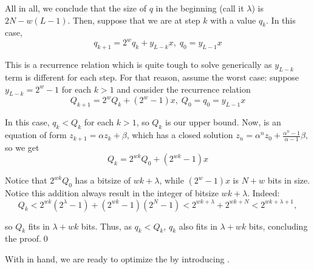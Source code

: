 \documentclass{iacrtrans}
\begin{document}
All in all, we conclude that the size of $q$ in the beginning (call it $\lambda$) is $2N - w(L-1)$. Then, suppose that we are at step $k$ with a value $q_k$. In this case,
\begin{equation}
    q_{k+1} = 2^wq_k + y_{L-k}x, \; q_0 = y_{L-1}x
\end{equation}

This is a recurrence relation which is quite tough to solve generically as $y_{L-k}$ term is different for each step. For that reason, assume the worst case: suppose $y_{L-k} = 2^w-1$ for each $k > 1$ and consider the recurrence relation
\begin{equation}\label{eq:recurrence_Q}
    Q_{k+1} = 2^wQ_k + (2^w-1)x, \; Q_0 = q_0 = y_{L-1}x
\end{equation}

In this case, $q_k < Q_k$ for each $k > 1$, so $Q_k$ is our upper bound. Now,  is an equation of form $z_{k+1}=\alpha z_k+\beta$, which has a closed solution $z_n = \alpha^n z_0 + \frac{\alpha^n-1}{\alpha-1}\beta$, so we get
\begin{equation}
    Q_k = 2^{wk}Q_0 + (2^{wk}-1)x
\end{equation}

Notice that $2^{wk}Q_0$ has a bitsize of $wk+\lambda$, while $(2^{w}-1)x$ is $N+w$ bits in size. Notice this addition always result in the integer of bitsize $wk+\lambda$. Indeed:
\begin{equation}
    Q_k < 2^{wk}(2^{\lambda}-1) + (2^{wk}-1)(2^{N}-1) < 2^{wk+\lambda} + 2^{wk+N} < 2^{wk+\lambda+1},
\end{equation}

so $Q_k$ fits in $\lambda+wk$ bits. Thus, as $q_k<Q_k$, $q_k$ also fits in $\lambda+wk$ bits, concluding the proof.\qed

With  in hand, we are ready to optimize the  by introducing . 
\end{document}
